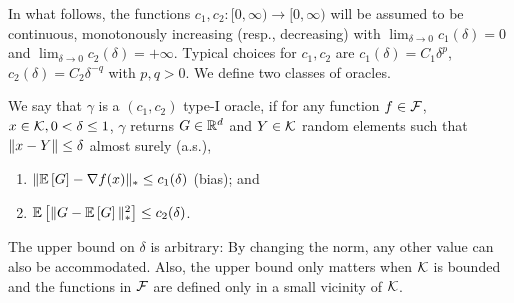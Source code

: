 In what follows, the functions $c_1,c_2:[0,\infty)\to [0,\infty)$ will be assumed to be continuous,
monotonously increasing (resp., decreasing) with
$\lim_{\delta\to  0} c_1(\delta)=0$ and $\lim_{\delta\to 0} c_2(\delta)=+\infty$.
Typical choices for $c_1,c_2$ are $c_1(\delta) = C_1 \delta^p$, $c_2(\delta) = C_2\delta^{-q}$ with $p,q>0$.
We define two classes of oracles. 
\begin{definition}
\label{def:oracle1}
We say that $\gamma$ is a  $(c_1,c_2)$ type-I oracle, if for any function $f\in \mathcal{F}$,
$x\in \mathcal{K},0<\delta\le 1$, $\gamma$ returns $G\in \mathbb{R}^d$ and  $Y\in \mathcal{K}$ random elements such that
$\|x-Y\|\le \delta$ almost surely (a.s.),
\vspace{-0.2cm}
\begin{enumerate}
\item $\| \mathbb{E}\left[G\right]  - \nabla f(x)  \|_* \le c_1(\delta) $ (bias); and
\item $\mathbb{E}\left[\| G -  \mathbb{E}\left[G\right] \|_*^2\right] \le c_2(\delta)$.
\end{enumerate}
\end{definition}
The upper bound on $\delta$ is arbitrary: By changing the norm, any other value can also be accommodated. Also, the upper bound only matters when $\mathcal{K}$ is bounded and the functions in $\mathcal{F}$ are defined only in a small vicinity of $\mathcal{K}$.

